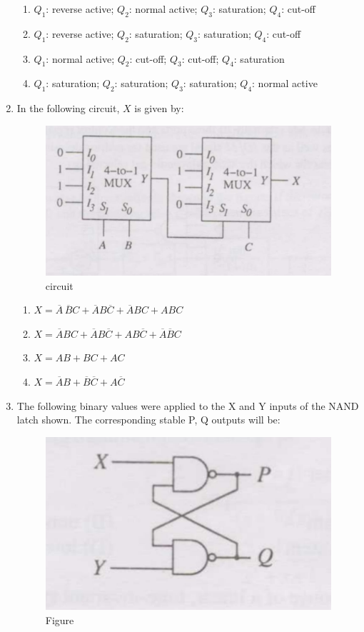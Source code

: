 \documentclass[journal,12pt,onecolumn]{IEEEtran}
\theoremstyle{remark}
\begin{document}
\begin{enumerate}
\hfill{}
\begin{enumerate}
  \item $Q_1$: reverse active; $Q_2$: normal active; $Q_3$: saturation; $Q_4$: cut-off
  \item $Q_1$: reverse active; $Q_2$: saturation; $Q_3$: saturation; $Q_4$: cut-off
  \item $Q_1$: normal active; $Q_2$: cut-off; $Q_3$: cut-off; $Q_4$: saturation
  \item $Q_1$: saturation; $Q_2$: saturation; $Q_3$: saturation; $Q_4$: normal active
\end{enumerate}

\item In the following circuit, $X$ is given by: 

\begin{figure}[H]
    \centering
    \includegraphics[width=0.6\linewidth]{Q43.jpg}
    \caption{circuit}
    \label{fig:full_wave}
\end{figure}
\hfill{}
\begin{enumerate}
  \item $X = \overline{A} \,\overline{B} C + \overline{A} B \overline{C} + \overline{A} B C + A B C$
  \item $X = \overline{A} B C + \overline{A} B \overline{C} + A B \overline{C} + \overline{A} \overline{B} C$
  \item $X = A B + B C + A C$
  \item $X = \overline{A} B + \overline{B} \overline{C} + A \overline{C}$
\end{enumerate}

\item The following binary values were applied to the X and Y inputs of the NAND latch shown. The corresponding stable P, Q outputs will be: 

\begin{figure}[H]
    \centering
    \includegraphics[width=0.4\linewidth]{Q44.jpg}
    \caption{Figure}
    \label{fig:full_wave}
\end{figure}


\end{enumerate}
\end{document}
